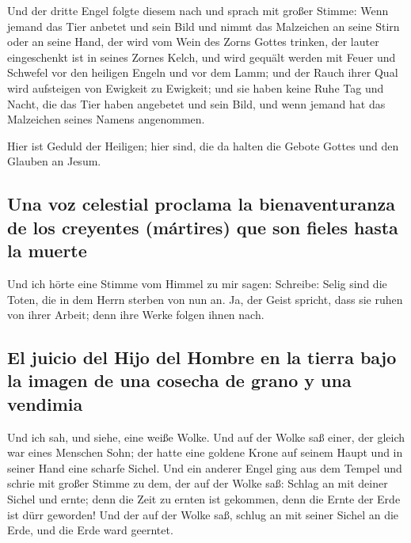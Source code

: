  Und der dritte Engel folgte diesem nach und sprach mit
großer Stimme: Wenn jemand das Tier anbetet und sein Bild und nimmt das
Malzeichen an seine Stirn oder an seine Hand,  der wird
vom Wein des Zorns Gottes trinken, der lauter eingeschenkt ist in seines
Zornes Kelch, und wird gequält werden mit Feuer und Schwefel vor den
heiligen Engeln und vor dem Lamm;  und der Rauch ihrer
Qual wird aufsteigen von Ewigkeit zu Ewigkeit; und sie haben keine Ruhe
Tag und Nacht, die das Tier haben angebetet und sein Bild, und wenn
jemand hat das Malzeichen seines Namens angenommen.

 Hier ist Geduld der Heiligen; hier sind, die da halten
die Gebote Gottes und den Glauben an Jesum.

\hypertarget{una-voz-celestial-proclama-la-bienaventuranza-de-los-creyentes-muxe1rtires-que-son-fieles-hasta-la-muerte}{%
\subsection{Una voz celestial proclama la bienaventuranza de los
creyentes (mártires) que son fieles hasta la
muerte}\label{una-voz-celestial-proclama-la-bienaventuranza-de-los-creyentes-muxe1rtires-que-son-fieles-hasta-la-muerte}}

 Und ich hörte eine Stimme vom Himmel zu mir sagen:
Schreibe: Selig sind die Toten, die in dem Herrn sterben von nun an. Ja,
der Geist spricht, dass sie ruhen von ihrer Arbeit; denn ihre Werke
folgen ihnen nach.

\hypertarget{el-juicio-del-hijo-del-hombre-en-la-tierra-bajo-la-imagen-de-una-cosecha-de-grano-y-una-vendimia}{%
\subsection{El juicio del Hijo del Hombre en la tierra bajo la imagen de
una cosecha de grano y una
vendimia}\label{el-juicio-del-hijo-del-hombre-en-la-tierra-bajo-la-imagen-de-una-cosecha-de-grano-y-una-vendimia}}

 Und ich sah, und siehe, eine weiße Wolke. Und auf der
Wolke saß einer, der gleich war eines Menschen Sohn; der hatte eine
goldene Krone auf seinem Haupt und in seiner Hand eine scharfe Sichel.
 Und ein anderer Engel ging aus dem Tempel und schrie mit
großer Stimme zu dem, der auf der Wolke saß: Schlag an mit deiner Sichel
und ernte; denn die Zeit zu ernten ist gekommen, denn die Ernte der Erde
ist dürr geworden!  Und der auf der Wolke saß, schlug an
mit seiner Sichel an die Erde, und die Erde ward geerntet.

